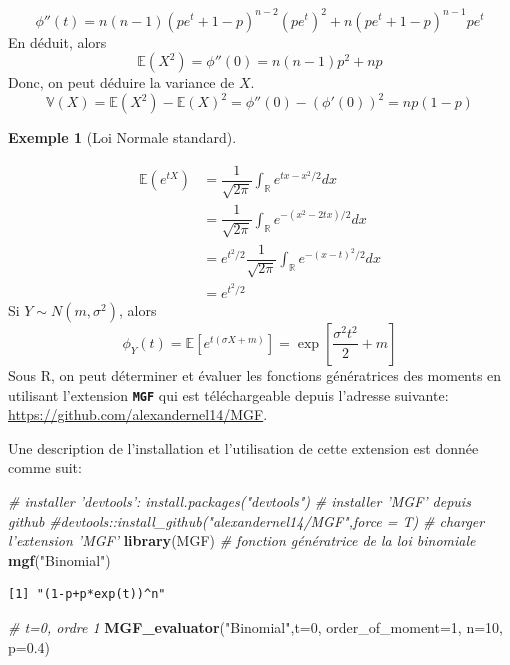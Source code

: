 \documentclass[
]{book}
\newenvironment{Shaded}{\begin{snugshade}}{\end{snugshade}}
\newcommand{\CommentTok}[1]{\textcolor[rgb]{0.56,0.35,0.01}{\textit{#1}}}
\newcommand{\DataTypeTok}[1]{\textcolor[rgb]{0.13,0.29,0.53}{#1}}
\newcommand{\DecValTok}[1]{\textcolor[rgb]{0.00,0.00,0.81}{#1}}
\newcommand{\FloatTok}[1]{\textcolor[rgb]{0.00,0.00,0.81}{#1}}
\newcommand{\KeywordTok}[1]{\textcolor[rgb]{0.13,0.29,0.53}{\textbf{#1}}}
\newcommand{\NormalTok}[1]{#1}
\newcommand{\StringTok}[1]{\textcolor[rgb]{0.31,0.60,0.02}{#1}}
\theoremstyle{definition}
\theoremstyle{definition}
\newtheorem{example}{Exemple}[chapter]
\theoremstyle{definition}
\theoremstyle{remark}
\begin{document}
\[
\phi''(t)=n(n-1){\left(pe^t+1-p \right)}^{n-2}{\left(pe^t\right)}^2+n{\left(pe^t+1-p \right)}^{n-1}pe^t
\]
En déduit, alors
\[
\mathbb{E}(X^2)=\phi''(0)=n(n-1)p^2+np
\]
Donc, on peut déduire la variance de \(X\).
\[
\mathbb{V}(X)=\mathbb{E}(X^2)-\mathbb{E}{(X)}^2=\phi''(0)-{\left( \phi'(0)\right)}^2=np(1-p)
\]
\begin{example}[Loi Normale standard]
\protect\hypertarget{exm:unnamed-chunk-15}{}{\label{exm:unnamed-chunk-15} {} }
\end{example}
\begin{align*}
\mathbb{E}\left(e^{tX} \right)&=\dfrac{1}{\sqrt{2\pi}}\int_{\mathbb{R}}e^{tx-x^2/2}dx\\
&=\dfrac{1}{\sqrt{2\pi}}\int_{\mathbb{R}}e^{-(x^2-2tx)/2}dx\\
&=e^{t^2/2}\dfrac{1}{\sqrt{2\pi}}\int_{\mathbb{R}}e^{-(x-t)^2/2}dx\\
&= e^{t^2/2}
\end{align*}
Si \(Y \sim N(m,\sigma^2)\), alors
\[
\phi_Y(t)=\mathbb{E}\left[e^{t(\sigma X+m)} \right]=\exp\left[\dfrac{\sigma^2t^2}{2}+m \right]
\]
Sous R, on peut déterminer et évaluer les fonctions génératrices des moments en utilisant l'extension \textbf{\texttt{MGF}} qui est téléchargeable depuis l'adresse suivante: \url{https://github.com/alexandernel14/MGF}.

Une description de l'installation et l'utilisation de cette extension est donnée comme suit:

\begin{Shaded}
\begin{Highlighting}[]
\CommentTok{# installer 'devtools': install.packages("devtools")}
\CommentTok{# installer 'MGF' depuis github}
\CommentTok{#devtools::install_github("alexandernel14/MGF",force = T)}
\CommentTok{# charger l'extension 'MGF'}
\KeywordTok{library}\NormalTok{(MGF)}
\CommentTok{# fonction génératrice de la loi binomiale}
\KeywordTok{mgf}\NormalTok{(}\StringTok{"Binomial"}\NormalTok{)}
\end{Highlighting}
\end{Shaded}

\begin{verbatim}
[1] "(1-p+p*exp(t))^n"
\end{verbatim}

\begin{Shaded}
\begin{Highlighting}[]
\CommentTok{# t=0, ordre 1}
\KeywordTok{MGF_evaluator}\NormalTok{(}\StringTok{"Binomial"}\NormalTok{,}\DataTypeTok{t=}\DecValTok{0}\NormalTok{, }\DataTypeTok{order_of_moment=}\DecValTok{1}\NormalTok{, }\DataTypeTok{n=}\DecValTok{10}\NormalTok{, }\DataTypeTok{p=}\FloatTok{0.4}\NormalTok{)}
\end{Highlighting}
\end{Shaded}
\end{document}
